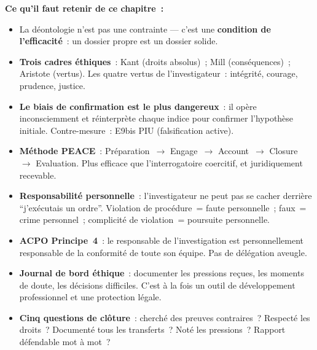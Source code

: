 \begin{boxresume}
\textbf{Ce qu'il faut retenir de ce chapitre~:}
\begin{itemize}
    \item La déontologie n'est pas une contrainte --- c'est une
          \textbf{condition de l'efficacité}~: un dossier propre est
          un dossier solide.

    \item \textbf{Trois cadres éthiques}~: Kant (droits absolus)~;
          Mill (conséquences)~; Aristote (vertus). Les quatre vertus
          de l'investigateur~: intégrité, courage, prudence, justice.

    \item \textbf{Le biais de confirmation est le plus dangereux}~:
          il opère inconsciemment et réinterprète chaque indice
          pour confirmer l'hypothèse initiale. Contre-mesure~:
          E9bis PIU (falsification active).

    \item \textbf{Méthode PEACE}~: Préparation~$\to$ Engage~$\to$
          Account~$\to$ Closure~$\to$ Evaluation. Plus efficace que
          l'interrogatoire coercitif, et juridiquement recevable.

    \item \textbf{Responsabilité personnelle}~: l'investigateur ne
          peut pas se cacher derrière ``j'exécutais un ordre''.
          Violation de procédure~= faute personnelle~; faux~= crime
          personnel~; complicité de violation~= poursuite personnelle.

    \item \textbf{ACPO Principe~4}~: le responsable de l'investigation
          est personnellement responsable de la conformité de toute
          son équipe. Pas de délégation aveugle.

    \item \textbf{Journal de bord éthique}~: documenter les pressions
          reçues, les moments de doute, les décisions difficiles.
          C'est à la fois un outil de développement professionnel
          et une protection légale.

    \item \textbf{Cinq questions de clôture}~: cherché des preuves
          contraires~? Respecté les droits~? Documenté tous les
          transferts~? Noté les pressions~? Rapport défendable
          mot à mot~?
\end{itemize}
\end{boxresume}

